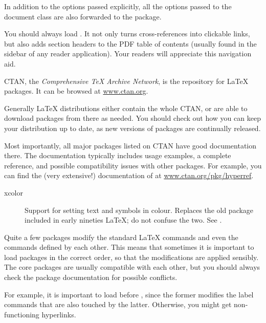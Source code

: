 In addition to the options passed explicitly,
all the options passed to the document class are also forwarded to the package.

\begin{practices}
You should always load .
It not only turns cross-references into clickable links,
but also adds section headers to the PDF table of contents
(usually found in the sidebar of any reader application).
Your readers will appreciate this navigation aid.
\end{practices}

CTAN, the \emph{Comprehensive \TeX{} Archive Network},
is the repository for \LaTeX{} packages.
It can be browsed at \url{www.ctan.org}.

Generally \LaTeX{} distributions either contain the whole CTAN,
or are able to download packages from there as needed.
You should check out how you can keep your distribution up to date,
as new versions of packages are continually released.

Most importantly, all major packages listed on CTAN have good documentation there.
The documentation typically includes usage examples, a complete reference,
and possible compatibility issues with other packages.
For example, you can find the (very extensive!) documentation of 
at \url{www.ctan.org/pkg/hyperref}.

\begin{description}
\item[xcolor] Support for setting text and symbols in colour.
    Replaces the old  package included in early nineties \LaTeX{};
    do not confuse the two.
    See .
\end{description}


\begin{gotcha}
Quite a few packages modify the standard \LaTeX{} commands
and even the commands defined by each other.
This means that sometimes it is important to load packages in the correct order,
so that the modifications are applied sensibly.
The core packages are usually compatible with each other,
but you should always check the package documentation for possible conflicts.

For example, it is important to load  before ,
since the former modifies the label commands that are also touched by the latter.
Otherwise, you might get non-functioning hyperlinks.
\end{gotcha}




